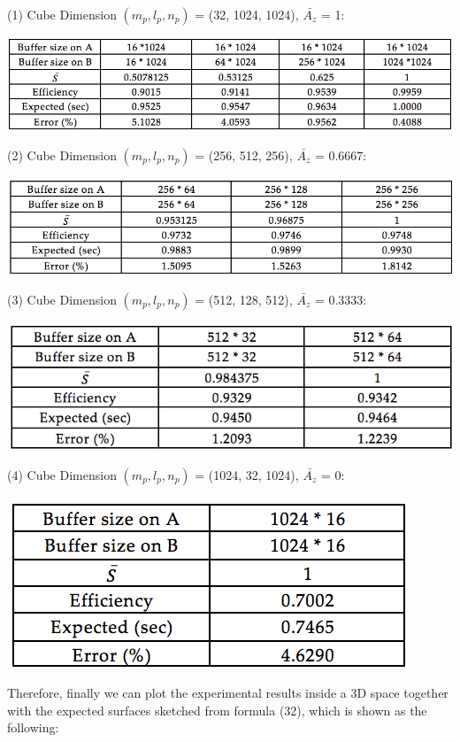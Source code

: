 \documentclass{amsart}
\theoremstyle{definition}
\theoremstyle{remark}
\numberwithin{equation}{section}
\begin{document}
(1) Cube Dimension $(m_p , l_p, n_p)$ = (32, 1024, 1024), $\bar{A_z}$ = 1:

\includegraphics[scale=0.8]{figures/table_p64_1.png}

(2) Cube Dimension $(m_p , l_p, n_p)$ = (256, 512, 256), $\bar{A_z}$ = 0.6667:

\includegraphics[scale=0.8]{figures/table_p64_2.png}

(3) Cube Dimension $(m_p , l_p, n_p)$ = (512, 128, 512), $\bar{A_z}$ = 0.3333:

\includegraphics[scale=0.8]{figures/table_p64_3.png}

(4) Cube Dimension $(m_p , l_p, n_p)$ = (1024, 32, 1024), $\bar{A_z}$ = 0:

\includegraphics[scale=0.8]{figures/table_p64_4.png}

Therefore, finally we can plot the experimental results inside a 3D space together with the expected surfaces sketched from formula (32), which is shown as the following:
\end{document}
